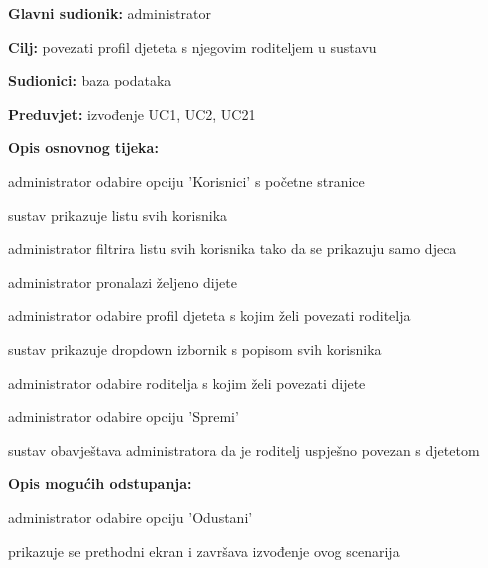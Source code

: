                     \noindent {}
					\begin{packed_item}
	
						\item \textbf{Glavni sudionik: }administrator
						\item  \textbf{Cilj:} povezati profil djeteta s njegovim roditeljem u sustavu
						\item  \textbf{Sudionici:} baza podataka
						\item  \textbf{Preduvjet:} izvođenje UC1, UC2, UC21
						\item  \textbf{Opis osnovnog tijeka:}
						
						\item[] \begin{packed_enum}
							\item administrator odabire opciju 'Korisnici' s početne stranice
							\item sustav prikazuje listu svih korisnika
							\item administrator filtrira listu svih korisnika tako da se prikazuju samo djeca
							\item administrator pronalazi željeno dijete
							\item administrator odabire profil djeteta s kojim želi povezati roditelja
							\item sustav prikazuje dropdown izbornik s popisom svih korisnika
							\item administrator odabire roditelja s kojim želi povezati dijete
							\item administrator odabire opciju 'Spremi'
							\item sustav obavještava administratora da je roditelj uspješno povezan s djetetom
						
						\end{packed_enum}
						\item  \textbf{Opis mogućih odstupanja:}
						
						\item[] \begin{packed_item}
							\item[8.a] administrator odabire opciju 'Odustani'
							\item [] \begin{packed_enum}
								\item prikazuje se prethodni ekran i završava izvođenje ovog scenarija
							\end{packed_enum}
						\end{packed_item}
					\end{packed_item}
                    
